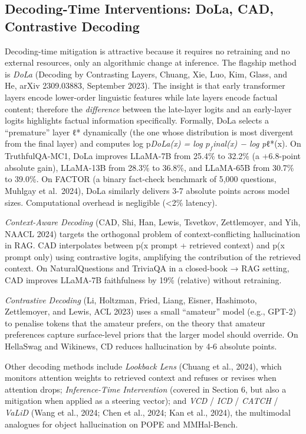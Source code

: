 \subsection{Decoding-Time Interventions: DoLa, CAD, Contrastive Decoding}\label{decoding-time-interventions-dola-cad-contrastive-decoding}

Decoding-time mitigation is attractive because it requires no retraining and no external resources, only an algorithmic change at inference. The flagship method is \emph{DoLa} (Decoding by Contrasting Layers, Chuang, Xie, Luo, Kim, Glass, and He, arXiv 2309.03883, September 2023). The insight is that early transformer layers encode lower-order linguistic features while late layers encode factual content; therefore the \emph{difference} between the late-layer logits and an early-layer logits highlights factual information specifically. Formally, DoLa selects a ``premature'' layer ℓ* dynamically (the one whose distribution is most divergent from the final layer) and computes log p\emph{DoLa(x) = log \(p_f\)inal(x) − log p}ℓ*(x). On TruthfulQA-MC1, DoLa improves LLaMA-7B from 25.4\% to 32.2\% (a +6.8-point absolute gain), LLaMA-13B from 28.3\% to 36.8\%, and LLaMA-65B from 30.7\% to 39.0\%. On FACTOR (a binary fact-check benchmark of 5,000 questions, Muhlgay et al.~2024), DoLa similarly delivers 3-7 absolute points across model sizes. Computational overhead is negligible (\textless2\% latency).

\emph{Context-Aware Decoding} (CAD, Shi, Han, Lewis, Tsvetkov, Zettlemoyer, and Yih, NAACL 2024) targets the orthogonal problem of context-conflicting hallucination in RAG. CAD interpolates between p(x \textbar{} prompt + retrieved context) and p(x \textbar{} prompt only) using contrastive logits, amplifying the contribution of the retrieved context. On NaturalQuestions and TriviaQA in a closed-book → RAG setting, CAD improves LLaMA-7B faithfulness by 19\% (relative) without retraining.

\emph{Contrastive Decoding} (Li, Holtzman, Fried, Liang, Eisner, Hashimoto, Zettlemoyer, and Lewis, ACL 2023) uses a small ``amateur'' model (e.g., GPT-2) to penalise tokens that the amateur prefers, on the theory that amateur preferences capture surface-level priors that the larger model should override. On HellaSwag and Wikinews, CD reduces hallucination by 4-6 absolute points.

Other decoding methods include \emph{Lookback Lens} (Chuang et al., 2024), which monitors attention weights to retrieved context and refuses or revises when attention drops; \emph{Inference-Time Intervention} (covered in Section 6, but also a mitigation when applied as a steering vector); and \emph{VCD} / \emph{ICD} / \emph{CATCH} / \emph{VaLiD} (Wang et al., 2024; Chen et al., 2024; Kan et al., 2024), the multimodal analogues for object hallucination on POPE and MMHal-Bench.

